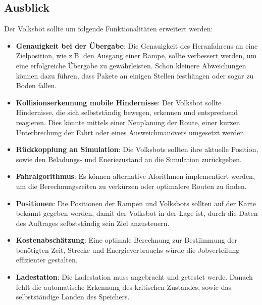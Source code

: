 \subsection{Ausblick}

Der Volksbot sollte um folgende Funktionalitäten erweitert werden:

\begin{itemize}

\item \textbf{Genauigkeit bei der Übergabe}: Die Genauigkeit des Heranfahrens an eine Zielposition, wie z.B. den Ausgang einer Rampe, sollte verbessert werden, um eine erfolgreiche Übergabe zu gewährleisten. Schon kleinere Abweichungen können dazu führen, dass Pakete an einigen Stellen festhängen oder sogar zu Boden fallen.

\item \textbf{Kollisionserkennung mobile Hindernisse}: Der Volksbot sollte Hindernisse, die sich selbstständig bewegen, erkennen und entsprechend reagieren. Dies könnte mittels einer Neuplanung der Route, einer kurzen Unterbrechung der Fahrt oder eines Ausweichmanövers umgesetzt werden. 

\item \textbf{Rückkopplung an Simulation}: Die Volksbots sollten ihre aktuelle Position, sowie den Beladungs- und Eneriezustand an die Simulation zurückgeben.

\item \textbf{Fahralgorithmus}: Es können alternative Alorithmen implementiert werden, um die Berechnungszeiten zu verkürzen oder optimalere Routen zu finden. 

\item \textbf{Positionen}: Die Positionen der Rampen und Volksbots sollten auf der Karte bekannt gegeben werden, damit der Volksbot in der Lage ist, durch die Daten des Auftrages selbstständig sein Ziel anzusteuern.

\item \textbf{Kostenabschätzung}: Eine optimale Berechnung zur Bestiimmung der benötigten Zeit, Strecke und Energieverbrauchs würde die Jobverteilung effizienter gestalten.

\item \textbf{Ladestation}: Die Ladestation muss angebracht und getestet werde. Danach fehlt die automatische Erkennung des kritischen Zustandes, sowie das selbstständige Landen des Speichers.

\end{itemize}




